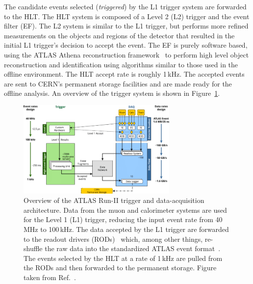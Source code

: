 The candidate events selected (\textit{triggered}) by the L1 trigger system are forwarded to the HLT.
The HLT system is composed of a Level 2 (L2) trigger and the event filter (EF).
The L2 system is similar to the L1 trigger, but performs more refined measurements on the objects and
regions of the detector that resulted in the initial L1 trigger's decision to accept the event.
The EF is purely software based, using the ATLAS Athena reconstruction framework~\cite{AthenaRef}
to perform high level object reconstruction and identification using algorithms similar to those used
in the offline environment.
The HLT accept rate is roughly 1\,kHz.
The accepted events are sent to CERN's permanent storage facilities and are made ready for the offline analysis.
An overview of the trigger system is shown in Figure~\ref{fig:run2_trigger}.


\begin{figure}[!htb]
    \begin{center}
        \includegraphics[width=0.7\textwidth]{figures/chapter2/tdaq/atlas_run2_trigger_system}
        \caption{
            Overview of the ATLAS Run-II trigger and data-acquisition architecture.
            Data from the muon and calorimeter systems are used for the Level 1 (L1) trigger, reducing
            the input event rate from 40\,MHz to 100\,kHz.
            The data accepted by the L1 trigger are forwarded to the readout drivers (RODs)~\cite{Jenni:616089}
            which, among other things, re-shuffle the raw data into the standardized ATLAS event format~\cite{Bee:683741}.
            The events selected by the HLT at a rate of 1\,kHz are pulled from the RODs and then forwarded to the permanent
            storage.
            Figure taken from Ref.~\cite{PanduroVazquez:2244345}.
        }
        \label{fig:run2_trigger}
    \end{center}
\end{figure}
